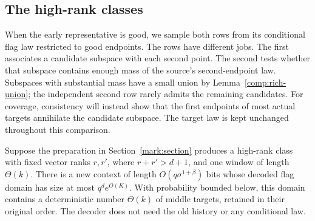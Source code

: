 \subsection{The high-rank classes}

When the early representative is good, we sample both rows from its
conditional flag law restricted to good endpoints. The rows have
different jobs. The first associates a candidate subspace with each
second point. The second tests whether that subspace contains enough
mass of the source's second-endpoint law.
Subspaces with substantial mass have a small union by
Lemma~\ref{comp:rich-union}; the independent second row rarely admits
the remaining candidates. For coverage, consistency will instead show
that the first endpoints of most actual targets annihilate the candidate
subspace. The target law is kept unchanged throughout this comparison.

\begin{lemma}\label{comp:high-rank}
Suppose the preparation in Section~\ref{mark:section} produces a
high-rank class with fixed vector ranks \(r,r'\), where
\(r+r'>d+1\), and one window of length \(\Theta(k)\).
There is a new context of length \(O(q\sigma^{1+\beta})\) bits whose
decoded flag domain has size at most \(q^d e^{O(K)}\).
With probability bounded below, this domain contains a deterministic
number \(\Theta(k)\) of middle targets, retained in their original order.
The decoder does not need the old history or any conditional law.
\end{lemma}

